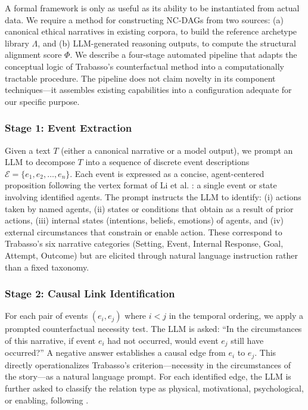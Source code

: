 \documentclass[11pt,letterpaper]{article}
\theoremstyle{defn}
\begin{document}
A formal framework is only as useful as its ability to be instantiated from actual data. We require a method for constructing NC-DAGs from two sources: (a) canonical ethical narratives in existing corpora, to build the reference archetype library $\Lambda$, and (b) LLM-generated reasoning outputs, to compute the structural alignment score $\Phi$. We describe a four-stage automated pipeline that adapts the conceptual logic of Trabasso's counterfactual method into a computationally tractable procedure. The pipeline does not claim novelty in its component techniques---it assembles existing capabilities into a configuration adequate for our specific purpose.

\subsubsection*{Stage 1: Event Extraction}

Given a text $T$ (either a canonical narrative or a model output), we prompt an LLM to decompose $T$ into a sequence of discrete event descriptions $\mathcal{E} = \{e_1, e_2, \ldots, e_n\}$. Each event is expressed as a concise, agent-centered proposition following the vertex format of Li et al. \citeyearpar{li2025}: a single event or state involving identified agents. The prompt instructs the LLM to identify: (i) actions taken by named agents, (ii) states or conditions that obtain as a result of prior actions, (iii) internal states (intentions, beliefs, emotions) of agents, and (iv) external circumstances that constrain or enable action. These correspond to Trabasso's six narrative categories (Setting, Event, Internal Response, Goal, Attempt, Outcome) but are elicited through natural language instruction rather than a fixed taxonomy.

\subsubsection*{Stage 2: Causal Link Identification}

For each pair of events $(e_i, e_j)$ where $i < j$ in the temporal ordering, we apply a prompted counterfactual necessity test. The LLM is asked: ``In the circumstances of this narrative, if event $e_i$ had not occurred, would event $e_j$ still have occurred?'' A negative answer establishes a causal edge from $e_i$ to $e_j$. This directly operationalizes Trabasso's criterion---necessity in the circumstances of the story---as a natural language prompt. For each identified edge, the LLM is further asked to classify the relation type as physical, motivational, psychological, or enabling, following \citet{trabasso1989}.
\end{document}
